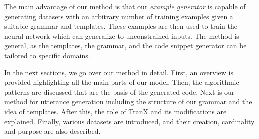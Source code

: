 The main advantage of our method is that our \emph{example generator} is capable
of generating datasets with an arbitrary number of training examples given a
suitable grammar and templates. These examples are then used to train the neural
network which can generalize to unconstrained inputs. The method is general, as
the templates, the grammar, and the code snippet generator can be tailored to
specific domains.

In the next sections, we go over our method in detail. First, an overview is
provided highlighting all the main parts of our model. Then, the algorithmic
patterns are discussed that are the basis of the generated code. Next is our
method for utterance generation including the structure of our grammar and the
idea of templates. After this, the role of TranX and its modifications are
explained. Finally, various datasets are introduced, and their creation,
cardinality and purpose are also described.
